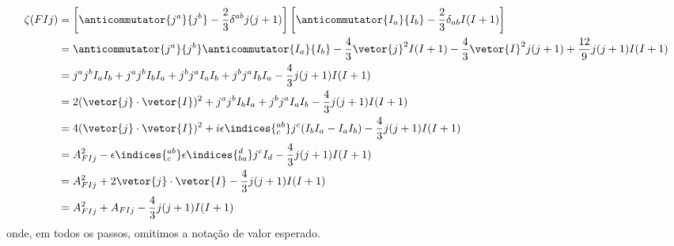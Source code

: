 \begin{align*}
   \zeta(FIj) &= \left[\anticommutator{j^a}{j^b} - \frac23 \delta^{ab} j(j+1)\right]\left[\anticommutator{I_a}{I_b} - \frac23 \delta_{ab} I(I+1)\right]\\
              &= \anticommutator{j^a}{j^b} \anticommutator{I_a}{I_b} - \frac43 \vetor{j}^2 I(I+1) - \frac43 \vetor{I}^2 j(j+1) + \frac{12}9 j(j+1) I(I+1)\\
              &= j^a j^b I_a I_b + j^a j^b I_b I_a + j^b j^a I_a I_b + j^b j^a I_b I_a - \frac43 j(j+1) I(I+1)\\
              &= 2 (\vetor{j} \cdot \vetor{I})^2 + j^a j^b I_b I_a + j^b j^a I_a I_b - \frac43 j(j+1) I(I+1)\\
              &= 4 (\vetor{j} \cdot \vetor{I})^2 + i \epsilon\indices{_c^{ab}}j^c (I_b I_a - I_a I_b) - \frac43 j(j+1) I(I+1)\\
              &= A_{FIj}^2 - \epsilon\indices{_c^{ab}} \epsilon\indices{^d_{ba}} j^cI_d - \frac43 j(j+1) I(I+1)\\
              &= A_{FIj}^2 + 2 \vetor{j} \cdot \vetor{I} - \frac43 j(j+1) I(I+1)\\
              &= A_{FIj}^2 + A_{FIj} - \frac43 j(j+1) I(I+1)
\end{align*}
onde, em todos os passos, omitimos a notação de valor esperado.
